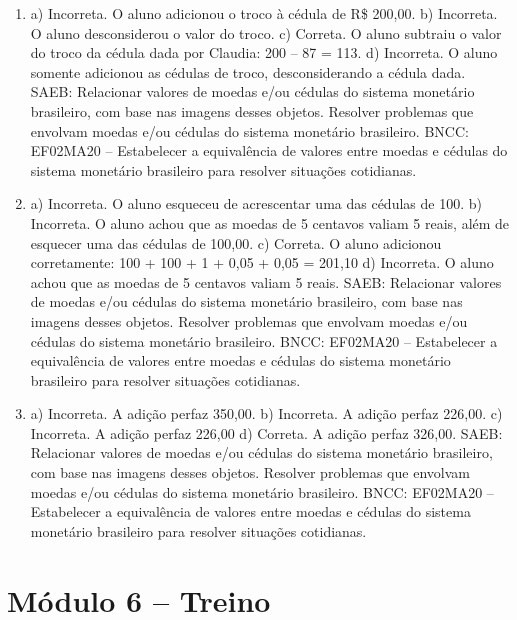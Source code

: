\begin{enumerate}
\item
a) Incorreta. O aluno adicionou o troco à cédula de R\$ 200,00.
b) Incorreta. O aluno desconsiderou o valor do troco.
c) Correta. O aluno subtraiu o valor do troco da cédula dada por Claudia: 200 -- 87 = 113.
d) Incorreta. O aluno somente adicionou as cédulas de troco, desconsiderando a cédula dada.
SAEB: Relacionar valores de moedas e/ou cédulas do sistema
monetário brasileiro, com base nas imagens desses objetos.
Resolver problemas que envolvam moedas e/ou cédulas do sistema
monetário brasileiro.
BNCC: EF02MA20 -- Estabelecer a equivalência de valores entre moedas e cédulas do sistema monetário brasileiro para resolver situações cotidianas.

\item
a) Incorreta. O aluno esqueceu de acrescentar uma das cédulas de 100.
b) Incorreta. O aluno achou que as moedas de 5 centavos valiam 5 reais, além de esquecer uma das cédulas de 100,00.
c) Correta. O aluno adicionou corretamente: 100 + 100 + 1 + 0,05 + 0,05 = 201,10
d) Incorreta. O aluno achou que as moedas de 5 centavos valiam 5 reais.
SAEB: Relacionar valores de moedas e/ou cédulas do sistema
monetário brasileiro, com base nas imagens desses objetos.
Resolver problemas que envolvam moedas e/ou cédulas do sistema monetário brasileiro.
BNCC: EF02MA20 -- Estabelecer a equivalência de valores entre moedas e
cédulas do sistema monetário brasileiro para resolver situações cotidianas.

\item
a) Incorreta. A adição perfaz 350,00.
b) Incorreta. A adição perfaz 226,00.
c) Incorreta. A adição perfaz 226,00
d) Correta. A adição perfaz 326,00.
SAEB: Relacionar valores de moedas e/ou cédulas do sistema
monetário brasileiro, com base nas imagens desses objetos.
Resolver problemas que envolvam moedas e/ou cédulas do sistema
monetário brasileiro.
BNCC: EF02MA20 -- Estabelecer a equivalência de valores entre moedas e cédulas do sistema monetário brasileiro para resolver situações cotidianas.
\end{enumerate}

\section*{Módulo 6 – Treino}

